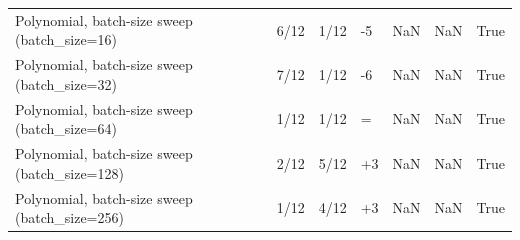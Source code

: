 \begin{tabular}{llllrrr}
Polynomial, batch-size sweep (batch\_size=16) & 6/12 & 1/12 & -5 & NaN & NaN & True \\
Polynomial, batch-size sweep (batch\_size=32) & 7/12 & 1/12 & -6 & NaN & NaN & True \\
Polynomial, batch-size sweep (batch\_size=64) & 1/12 & 1/12 & = & NaN & NaN & True \\
Polynomial, batch-size sweep (batch\_size=128) & 2/12 & 5/12 & +3 & NaN & NaN & True \\
Polynomial, batch-size sweep (batch\_size=256) & 1/12 & 4/12 & +3 & NaN & NaN & True \\
\bottomrule
\end{tabular}
